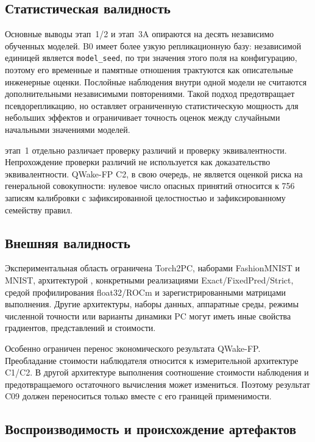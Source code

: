 \subsection{Статистическая валидность}

Основные выводы этап~1/2 и этап~3A опираются на десять независимо обученных
моделей. B0 имеет более узкую репликационную базу: независимой единицей является
\texttt{model\_seed}, по три значения этого поля на конфигурацию, поэтому его временные и
памятные отношения трактуются как описательные инженерные оценки. Послойные
наблюдения внутри одной модели не считаются дополнительными
независимыми повторениями. Такой подход предотвращает псевдорепликацию, но
оставляет ограниченную статистическую мощность для небольших эффектов и
ограничивает точность оценок между случайными начальными значениями моделей.

этап~1 отдельно различает проверку различий и проверку эквивалентности.
Непрохождение проверки различий не используется как доказательство
эквивалентности. QWake-FP C2, в свою очередь, не является оценкой риска на
генеральной совокупности: нулевое число опасных принятий относится к 756
записям калибровки с зафиксированной целостностью и зафиксированному семейству
правил.

\subsection{Внешняя валидность}

Экспериментальная область ограничена Torch2PC, наборами FashionMNIST и MNIST,
архитектурой , конкретными реализациями
Exact/FixedPred/Strict, средой профилирования float32/ROCm и
зарегистрированными матрицами выполнения. Другие архитектуры, наборы данных,
аппаратные среды, режимы численной точности или варианты динамики PC могут
иметь иные свойства градиентов, представлений и стоимости.

Особенно ограничен перенос экономического результата QWake-FP. Преобладание
стоимости наблюдателя относится к измерительной архитектуре C1/C2. В другой
архитектуре выполнения соотношение стоимости наблюдения и предотвращаемого
остаточного вычисления может измениться. Поэтому результат C09 должен
переноситься только вместе с его границей применимости.

\subsection{Воспроизводимость и происхождение артефактов}

